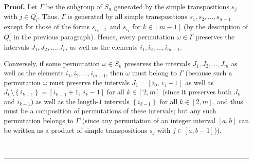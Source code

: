 \documentclass[numbers=enddot,12pt,final,onecolumn,notitlepage]{scrartcl}%
\theoremstyle{definition}
\newenvironment{proof}[1][Proof]{\noindent\textbf{#1.} }{\ \rule{0.5em}{0.5em}}
\begin{document}
\begin{proof}
Let $\Gamma$ be the subgroup of $S_{n}$ generated by the simple transpositions
$s_{j}$ with $j\in Q_{i}^{\prime}$. Thus, $\Gamma$ is generated by all simple
transpositions $s_{1},s_{2},\ldots,s_{n-1}$ except for those of the forms
$s_{i_{k}-1}$ and $s_{i_{k}}$ for $k\in\left[  m-1\right]  $ (by the
description of $Q_{i}^{\prime}$ in the previous paragraph). Hence, every
permutation $\omega\in\Gamma$ preserves the intervals $J_{1},J_{2}%
,\ldots,J_{m}$ as well as the elements $i_{1},i_{2},\ldots,i_{m-1}$.

Conversely, if some permutation $\omega\in S_{n}$ preserves the intervals
$J_{1},J_{2},\ldots,J_{m}$ as well as the elements $i_{1},i_{2},\ldots
,i_{m-1}$, then $\omega$ must belong to $\Gamma$ (because such a permutation
$\omega$ must preserve the intervals $J_{1}=\left[  i_{0},\ i_{1}-1\right]  $
as well as $J_{k}\setminus\left\{  i_{k-1}\right\}  =\left[  i_{k-1}%
+1,\ i_{k}-1\right]  $ for all $k\in\left[  2,m\right]  $ (since it preserves
both $J_{k}$ and $i_{k-1}$) as well as the length-$1$ intervals $\left\{
i_{k-1}\right\}  $ for all $k\in\left[  2,m\right]  $, and thus must be a
composition of permutations of these intervals; but any such permutation
belongs to $\Gamma$ (since any permutation of an integer interval $\left[
a,b\right]  $ can be written as a product of simple transpositions $s_{j}$
with $j\in\left[  a,b-1\right]  $)).


\end{proof}
\end{document}
